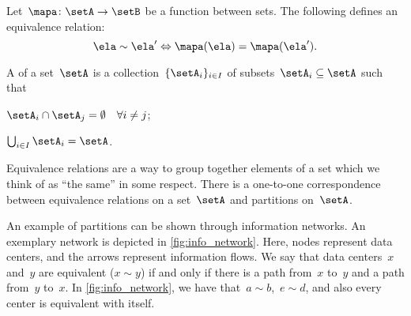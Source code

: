 \begin{example}
  Let~$\mapa\colon \setA\to \setB$ be a function between sets. The following defines an equivalence relation:
  \begin{equation*}
    \ela\sim \ela'\Leftrightarrow \mapa(\ela)=\mapa(\ela').
  \end{equation*}
\end{example}

\begin{definition}[Partition]
  \label{def:partition}
  A \emph{} of a set~$\setA$ is a collection~$\{\setA_i\}_{i\in I}$ of subsets~$\setA_i\subseteq \setA$ such that
  \begin{compactenum}
    \item $\setA_i\cap \setA_j=\emptyset \quad \forall i\neq j$;
    \item $\bigcup_{i\in I}\setA_i=\setA$.
  \end{compactenum}
\end{definition}

\begin{remark}
  Equivalence relations are a way to group together elements of a set which we think of as ``the same'' in some respect. There is a one-to-one correspondence between equivalence relations on a set~$\setA$ and partitions on~$\setA$.
\end{remark}


\begin{marginfigure}
  \centering
  \caption{}
  \label{fig:info_network}
\end{marginfigure}

\begin{example}
  An example of partitions can be shown through information networks.
  An exemplary network is depicted in \cref{fig:info_network}.
  Here, nodes represent data centers, and the arrows represent information flows.
  We say that data centers~$x$ and~$y$ are equivalent ($x\sim y$) if and only if there is a path from~$x$ to~$y$ and a path from~$y$ to~$x$.
  In \cref{fig:info_network}, we have that~$a\sim b$,~$e\sim d$, and also every center is equivalent with itself.
\end{example}

